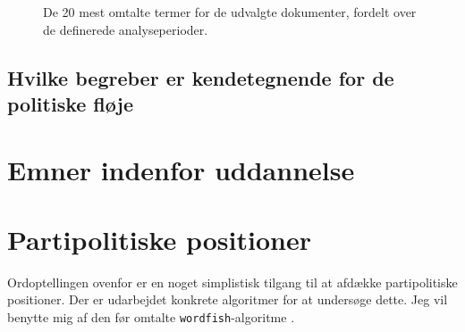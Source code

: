 \begin{figure}
  \caption{De 20 mest omtalte termer for de udvalgte dokumenter, fordelt over de definerede analyseperioder.} 
\end{figure}

\subsection{Hvilke begreber er kendetegnende for de politiske fløje}

\section{Emner indenfor uddannelse}

\section{Partipolitiske positioner}

Ordoptellingen ovenfor er en noget simplistisk tilgang til at afdække partipolitiske positioner.
Der er udarbejdet konkrete algoritmer for at undersøge dette.
Jeg vil benytte mig af den før omtalte \texttt{wordfish}-algoritme \autocite{slapinScalingModelEstimating2008}.

